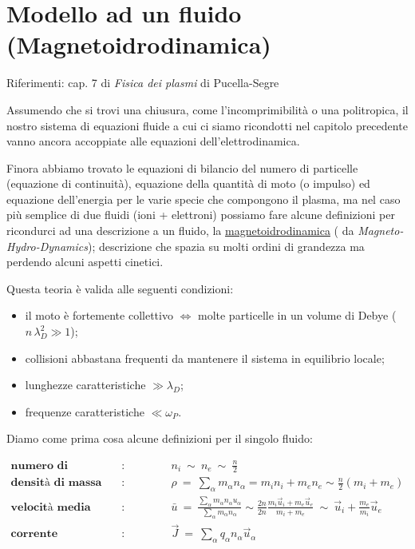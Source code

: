 \chapter{Modello ad un fluido (Magnetoidrodinamica)}

\epigraph{
	Riferimenti: cap. 7 di \emph{Fisica dei plasmi} di Pucella-Segre
}{}

Assumendo che si trovi una chiusura, come l'incomprimibilità o una politropica, il nostro sistema di equazioni fluide a cui ci siamo ricondotti nel capitolo precedente vanno ancora accoppiate alle equazioni dell'elettrodinamica.

Finora abbiamo trovato le equazioni di bilancio del numero di particelle (equazione di continuità), equazione della quantità di moto (o impulso) ed equazione dell'energia per le varie specie che compongono il plasma, ma nel caso più semplice di due fluidi (ioni + elettroni) possiamo fare alcune definizioni per ricondurci ad una descrizione a un fluido, la \underline{magnetoidrodinamica} ( da \emph{Magneto-Hydro-Dynamics}); descrizione che spazia su molti ordini di grandezza ma perdendo alcuni aspetti cinetici. 

Questa teoria è valida alle seguenti condizioni:
\begin{itemize}
	\item il moto è fortemente collettivo $\iff$ molte particelle in un volume di Debye ($n\, \lambda_D^2 \gg 1$);
	\item collisioni abbastana frequenti da mantenere il sistema in equilibrio locale;
	\item lunghezze caratteristiche $\gg \lambda_D$;
	\item frequenze caratteristiche $\ll \omega_P$.
\end{itemize}

Diamo come prima cosa alcune definizioni per il singolo fluido: 

\[ 
\begin{split}
	\textbf{numero di particelle} &:\qquad \qquad n_i\ \sim\ n_e\ \sim\ \frac{n}{2} \\
	\textbf{densità di massa} &:\qquad \qquad \rho\ =\ \sum_\alpha m_\alpha n_\alpha = m_i n_i + m_e n_e \sim \frac{n}{2}(m_i + m_e) \\
	\textbf{velocità media} &:\qquad \qquad \bar u\ =\ \frac{\sum_\alpha m_\alpha n_\alpha u_\alpha}{\sum_\alpha m_\alpha n_\alpha}\sim \frac{2n}{2n} \frac{m_i \vec u_i + m_e \vec u_e }{m_i + m_e}\ \sim\ \vec u_i + \frac{m_e}{m_i} \vec u_e \\
	\textbf{corrente} &:\qquad \qquad \vec J\ =\ \sum_\alpha q_\alpha n_\alpha \vec u_\alpha
\end{split}
\]


